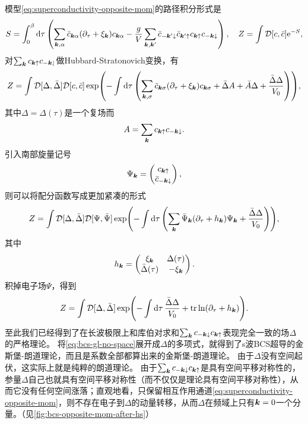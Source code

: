 模型\eqref{eq:superconductivity-opposite-mom}的路径积分形式是
\begin{equation}
    S = \int_0^\beta \dd{\tau} \left( \sum_{\vb*{k}, \alpha} \bar{c}_{\vb*{k} \alpha} (\partial_\tau + \xi_{\vb*{k}}) c_{\vb*{k} \alpha} - \frac{g}{V} \sum_{\vb*{k}, \vb*{k}'} \bar{c}_{- \vb*{k}' \downarrow} \bar{c}_{\vb*{k}' \uparrow} c_{\vb*{k} \uparrow} c_{- \vb*{k} \downarrow} \right), \quad Z = \int \mathcal{D} [c, \bar{c}] \mathrm{e}^{-S},
\end{equation}
对$\sum_{\vb*{k}} c_{\vb*{k} \uparrow} c_{- \vb*{k} \downharpoonleft}$做Hubbard-Stratonovich变换，有
\[
    Z = \int \mathcal{D} [\Delta, \bar{\Delta}] \mathcal{D} [c, \bar{c}] \exp(- \int \dd{\tau} \left( \sum_{\vb*{k}, \sigma} \bar{c}_{\vb*{k} \sigma} (\partial_\tau + \xi_{\vb*{k}}) c_{\vb*{k} \sigma} + \bar{\Delta} A + \bar{A} \Delta + \frac{\bar{\Delta} \Delta}{V_0} \right) ),
\]
其中$\Delta = \Delta(\tau)$是一个复场而
\[
    A = \sum_{\vb*{k}} c_{\vb*{k} \uparrow} c_{- \vb*{k} \downarrow}.
\]
引入南部旋量记号
\begin{equation}
    \Psi_{\vb*{k}} = \pmqty{c_{\vb*{k} \uparrow} \\ \bar{c}_{- \vb*{k} \downarrow}},
\end{equation}
则可以将配分函数写成更加紧凑的形式
\begin{equation}
    Z = \int \mathcal{D} [\Delta, \bar{\Delta}] \mathcal{D} [\Psi, \bar{\Psi}] \exp(- \int \dd{\tau} \left( \sum_{\vb*{k}} \bar{\Psi}_{\vb*{k}} (\partial_\tau + h_{\vb*{k}}) \Psi_{\vb*{k}} + \frac{\bar{\Delta} \Delta}{V_0} \right) ),
\end{equation}
其中
\begin{equation}
    h_{\vb*{k}} = \pmqty{\xi_{\vb*{k}} & \Delta(\tau) \\ \bar{\Delta}(\tau) & - \xi_{\vb*{k}}}.
\end{equation}
积掉电子场$\Psi$，得到
\begin{equation}
    Z = \int \fd{[\Delta, \bar{\Delta}]} \exp(- \int \dd{\tau} \frac{\bar{\Delta} \Delta}{V_0} + \trace \ln (\partial_\tau + h_{\vb*{k}})).
    \label{eq:bcs-gl-no-space}
\end{equation}
至此我们已经得到了在长波极限上和库伯对求和$\sum_{\vb*{k}} c_{- \vb*{k} \downarrow} c_{\vb*{k} \uparrow}$表现完全一致的场$\Delta$的严格理论。
将\eqref{eq:bcs-gl-no-space}展开成$\Delta$的多项式，就得到了s波BCS超导的金斯堡-朗道理论，而且是系数全部都算出来的金斯堡-朗道理论。
由于$\Delta$没有空间起伏，这实际上就是纯粹的朗道理论。
由于$\sum_{\vb*{k}} c_{- \vb*{k} \downarrow} c_{\vb*{k} \uparrow}$是具有空间平移对称性的，参量$\Delta$自己也就具有空间平移对称性（而不仅仅是理论具有空间平移对称性），从而它没有任何空间涨落；直观地看，只保留相互作用通道\eqref{eq:superconductivity-opposite-mom}，则不存在电子到$\Delta$的动量转移，从而$\Delta$在频域上只有$\vb*{k} = 0$一个分量。（见\autoref{fig:bcs-opposite-mom-after-hs}）

